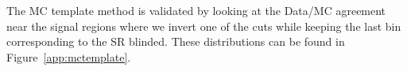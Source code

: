 The MC template method is validated by looking at the Data/MC agreement near the signal regions where we invert one of the cuts while keeping the last bin corresponding to the SR blinded. 
These distributions can be found in Figure~\ref{app:mctemplate}.

